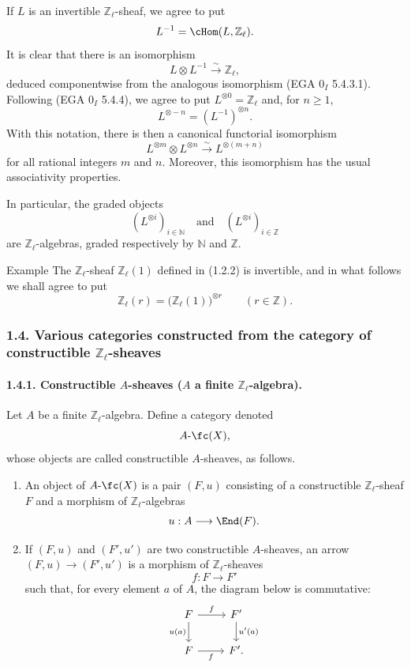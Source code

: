 If \(L\) is an invertible \(\mathbb Z_\ell\)-sheaf, we agree to put
\[
L^{-1}=\cHom(L,\mathbb Z_\ell).
\]
It is clear that there is an isomorphism
\[
L\otimes L^{-1}\xrightarrow{\sim}\mathbb Z_\ell,
\]
deduced componentwise from the analogous isomorphism (EGA \(0_I\) 5.4.3.1). Following (EGA \(0_I\) 5.4.4), we agree to put \(L^{\otimes0}=\mathbb Z_\ell\) and, for \(n\ge1\),
\[
L^{\otimes -n}=(L^{-1})^{\otimes n}.
\]
With this notation, there is then a canonical functorial isomorphism
\[
L^{\otimes m}\otimes L^{\otimes n}\xrightarrow{\sim}L^{\otimes(m+n)}
\]
for all rational integers \(m\) and \(n\). Moreover, this isomorphism has the usual associativity properties.

In particular, the graded objects
\[
(L^{\otimes i})_{i\in\mathbb N}\quad\text{and}\quad(L^{\otimes i})_{i\in\mathbb Z}
\]
are \(\mathbb Z_\ell\)-algebras, graded respectively by \(\mathbb N\) and \(\mathbb Z\).

\begin{statement}{Example}
The \(\mathbb Z_\ell\)-sheaf \(\mathbb Z_\ell(1)\) defined in (1.2.2) is invertible, and in what follows we shall agree to put
\[
\mathbb Z_\ell(r)=\bigl(\mathbb Z_\ell(1)\bigr)^{\otimes r}\qquad (r\in\mathbb Z).
\]
\end{statement}

\subsubsection*{1.4. Various categories constructed from the category of constructible \(\mathbb Z_\ell\)-sheaves}

\paragraph{1.4.1. Constructible \(A\)-sheaves (\(A\) a finite \(\mathbb Z_\ell\)-algebra).}
Let \(A\) be a finite \(\mathbb Z_\ell\)-algebra. Define a category denoted
\[
A\text{-}\fc(X),
\]
whose objects are called constructible \(A\)-sheaves, as follows.

\begin{enumerate}[label=(\roman*)]
\item An object of \(A\text{-}\fc(X)\) is a pair \((F,u)\) consisting of a constructible \(\mathbb Z_\ell\)-sheaf \(F\) and a morphism of \(\mathbb Z_\ell\)-algebras
\[
u:A\longrightarrow \End(F).
\]
\item If \((F,u)\) and \((F',u')\) are two constructible \(A\)-sheaves, an arrow \((F,u)\to(F',u')\) is a morphism of \(\mathbb Z_\ell\)-sheaves
\[
f:F\longrightarrow F'
\]
such that, for every element \(a\) of \(A\), the diagram below is commutative:
\[
\begin{tikzcd}
F \arrow[r,"f"] \arrow[d,"u(a)"'] & F' \arrow[d,"u'(a)"]\\
F \arrow[r,"f"'] & F'.
\end{tikzcd}
\]
\end{enumerate}

